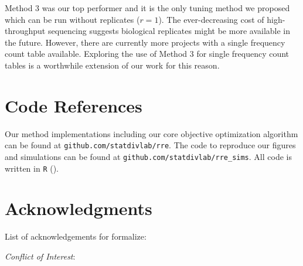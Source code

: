 \documentclass[oupdraft]{bio}
\begin{document}
Method 3 was our top performer and it is the only tuning method we proposed which can be run without replicates ($r = 1$).  The ever-decreasing cost of high-throughput sequencing suggests biological replicates might be more available in the future.  However, there are currently more projects with a single frequency count table available.  Exploring the use of Method 3 for single frequency count tables is a worthwhile extension of our work for this reason.

\section{Code References}
\label{sec:code}
Our method implementations including our core objective optimization algorithm can be found at \texttt{github.com/statdivlab/rre}.  The code to reproduce our figures and simulations can be found at \texttt{github.com/statdivlab/rre\_sims}.  All code is written in \texttt{R} (\citet{r_project}).


\section*{Acknowledgments}
List of acknowledgements for formalize:

{\it Conflict of Interest}:



\end{document}
